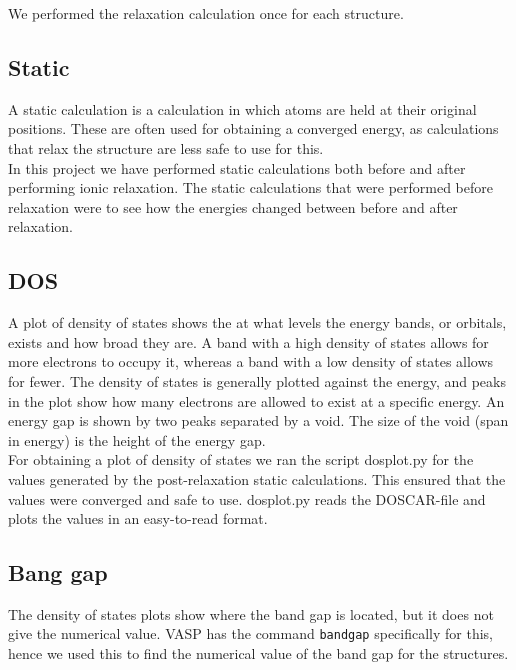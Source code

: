 \documentclass{article}
\begin{document}
    We performed the relaxation calculation once for each structure. \\


  \subsection{Static}

    A static calculation is a calculation in which atoms are held at their original positions. These are often used for obtaining a converged energy, as calculations that relax the structure are less safe to use for this.\\

    In this project we have performed static calculations both before and after performing ionic relaxation. The static calculations that were performed before relaxation were to see how the energies changed between before and after relaxation. \\


  \subsection{DOS}

    A plot of density of states shows the at what levels the energy bands, or orbitals, exists and how broad they are. A band with a high density of states allows for more electrons to occupy it, whereas a band with a low density of states allows for fewer. The density of states is generally plotted against the energy, and peaks in the plot show how many electrons are allowed to exist at a specific energy. An energy gap is shown by two peaks separated by a void. The size of the void (span in energy) is the height of the energy gap. \\

    For obtaining a plot of density of states we ran the script dosplot.py for the values generated by the post-relaxation static calculations. This ensured that the values were converged and safe to use. dosplot.py reads the DOSCAR-file and plots the values in an easy-to-read format. \\


  \subsection{Bang gap}

    The density of states plots show where the band gap is located, but it does not give the numerical value. VASP has the command \texttt{bandgap} specifically for this, hence we used this to find the numerical value of the band gap for the structures. \\
\end{document}
